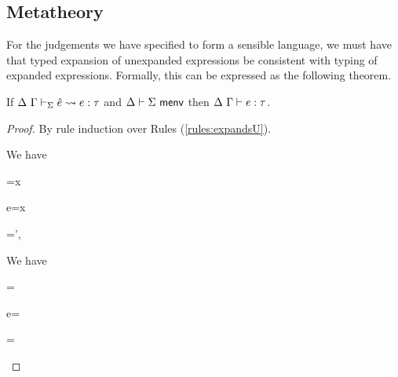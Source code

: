 \subsection{Metatheory}
For the judgements we have specified to form a sensible language, we must have that typed expansion of unexpanded expressions be consistent with typing of expanded expressions. Formally, this can be expressed as the following theorem.

\begin{theorem}\label{thm:typed-expansion-U}
If $\Delta~\Gamma \vdash_{\Sigma} \hat{e} \leadsto e : \tau$ and $\Delta \vdash \Sigma~\mathsf{menv}$ then $\Delta~\Gamma \vdash e : \tau$. 
\end{theorem}
\begin{proof}
By rule induction over Rules (\ref{rules:expandsU}).
\begin{byCases}
\item[\text{(\ref{rule:expandsU-var})}] We have
\begin{pfsteps}
  \item \ue=x 
  \item e=x 
  \item \Gamma=\Gamma',  
  \item {} 
\end{pfsteps}
\resetpfcounter

\item[\text{(\ref{rule:expandsU-lam})}] We have 
\begin{pfsteps}
  \item \ue= 
  \item e= 
  \item \tau= 
  \item {}  
  \item {}  
  \item \macenvOK{\Delta}{\Sigma}  
  \item {}  
  \item {} 
\end{pfsteps}
\resetpfcounter


\end{byCases}
\end{proof}
